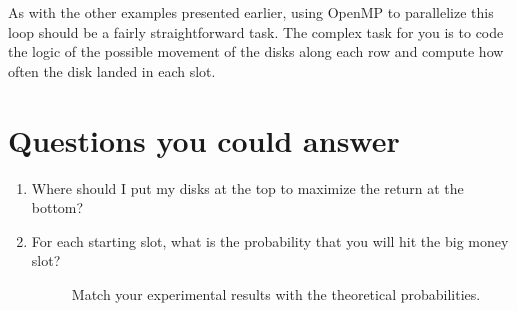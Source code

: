 \documentclass[letterpaper,10pt,openany,oneside]{sphinxmanual}
\begin{document}
As with the other examples presented earlier, using OpenMP to parallelize this loop
should be a fairly straightforward task.  The complex task for you is to code the logic
of the possible movement of the disks along each row and compute how often the
disk landed in each slot.


\section{Questions you could answer}
\label{Plinko/PlinkoGame:questions-you-could-answer}\begin{enumerate}
\item {} 
Where should I put my disks at the top to maximize the return at the bottom?

\item {} \begin{description}
\item[{For each starting slot, what is the probability that you will hit the big money slot?}] \leavevmode
Match your experimental results with the theoretical probabilities.

\end{description}

\end{enumerate}
\end{document}
